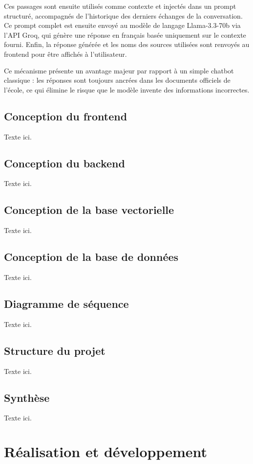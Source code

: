 \documentclass[12pt, a4paper, twoside]{report}
\begin{document}
Ces passages sont ensuite utilisés comme contexte et injectés dans un prompt structuré, accompagnés de l'historique des derniers échanges de la conversation. Ce prompt complet est ensuite envoyé au modèle de langage Llama-3.3-70b via l'API Groq, qui génère une réponse en français basée uniquement sur le contexte fourni. Enfin, la réponse générée et les noms des sources utilisées sont renvoyés au frontend pour être affichés à l'utilisateur.

Ce mécanisme présente un avantage majeur par rapport à un simple chatbot classique : les réponses sont toujours ancrées dans les documents officiels de l'école, ce qui élimine le risque que le modèle invente des informations incorrectes.

\section{Conception du frontend}
Texte ici.

\section{Conception du backend}
Texte ici.

\section{Conception de la base vectorielle}
Texte ici.

\section{Conception de la base de données}
Texte ici.

\section{Diagramme de séquence}
Texte ici.

\section{Structure du projet}
Texte ici.

\section{Synthèse}
Texte ici.

\chapter{Réalisation et développement}
\end{document}
